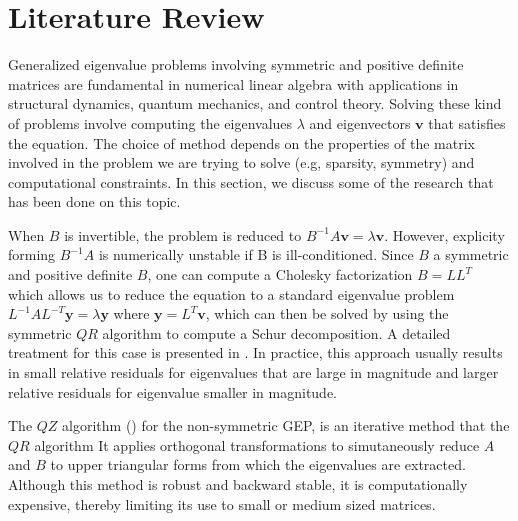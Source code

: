 \section{Literature Review}\label{sec:LiteratureReview}
Generalized eigenvalue problems involving symmetric and positive definite matrices are fundamental in numerical linear algebra with applications in structural  dynamics, quantum mechanics, and control theory. Solving these kind of problems involve computing the eigenvalues $\lambda$ and eigenvectors $\mathbf{v}$ that satisfies the equation. The choice of method depends on the properties of the matrix involved in the problem we are trying to solve (e.g, sparsity, symmetry) and computational constraints. In this section, we discuss some of the research that has been done on this topic.

When $B$ is invertible, the problem is reduced to $B^{-1}A\mathbf{v} = \lambda \mathbf{v}$. However, explicity forming $B^{-1}A$ is numerically unstable if B is ill-conditioned. Since $B$ a symmetric and positive definite $B$, one can compute a Cholesky factorization $B = LL^{T}$ which allows us to reduce the equation to a standard eigenvalue problem $L^{-1}AL^{-T}\mathbf{y} = \lambda \mathbf{y}$ where $\mathbf{y}= L^T \mathbf{v}$, which can then be solved by using the symmetric $QR$ algorithm to compute a Schur decomposition. A detailed treatment for this case is presented in \cite{doi:10.1137/1.9781421407944}. In practice, this approach usually results in small relative residuals for eigenvalues that are large in magnitude and larger relative residuals for eigenvalue smaller in magnitude.

The $QZ$ algorithm (\cite{5b3d5fb1-4813-3046-9331-a730b392f611}) for the non-symmetric GEP, is an iterative method that  the $QR$ algorithm  It applies orthogonal transformations to simutaneously reduce $A$ and $B$ to upper triangular forms from which the eigenvalues are extracted. Although this method is robust and backward stable, it is computationally expensive, thereby limiting its use to small or medium sized matrices.

